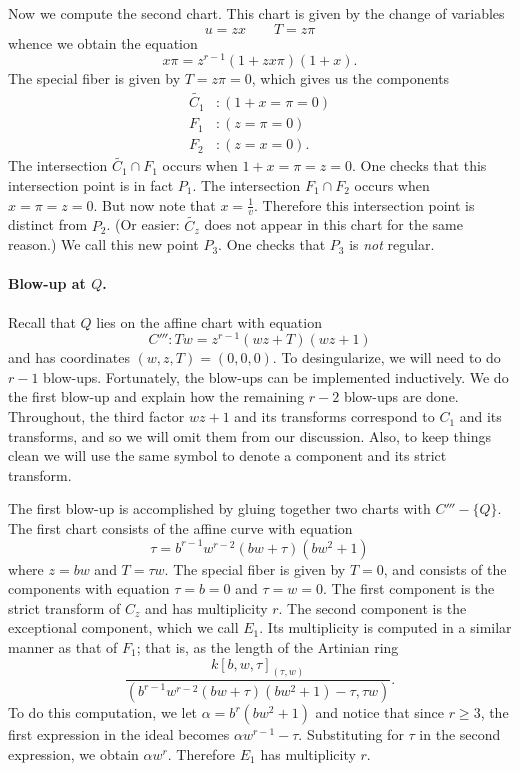 \documentclass{article}
\theoremstyle{plain}
\theoremstyle{definition}
\theoremstyle{remark}
\renewcommand{\tilde}[1]{\widetilde{#1}}
\begin{document}
Now we compute the second chart. This chart is given by the change of variables
\[
u=zx \qquad T=z\pi
\]
whence we obtain the equation
\[
x\pi = z^{r-1}(1 + zx\pi)(1 + x).
\]
The special fiber is given by $T = z\pi = 0$, which gives us the components
\begin{align*}
  \tilde{C_1}&: (1 + x = \pi = 0) \\
  F_1&: (z = \pi = 0) \\
  F_2&: (z = x = 0).
\end{align*}
The intersection $\tilde{C_1} \cap F_1$ occurs when $1 + x = \pi = z = 0$. One checks that this intersection point is in fact $P_1$. The intersection $F_1 \cap F_2$ occurs when $x = \pi = z = 0$. But now note that $x = \frac{1}{v}$. Therefore this intersection point is distinct from $P_2$. (Or easier: $\tilde{C_z}$ does not appear in this chart for the same reason.) We call this new point $P_3$. One checks that $P_3$ is \emph{not} regular.



\paragraph{Blow-up at $Q$.}
\label{sec:blow-up-Q}

Recall that $Q$ lies on the affine chart with equation
\begin{equation}
  C''':Tw = z^{r-1}(wz + T)(wz + 1)\label{eq:C'''}
\end{equation}
and has coordinates $(w,z,T) = (0,0,0)$. To desingularize, we will need to do $r-1$ blow-ups. Fortunately, the blow-ups can be implemented inductively. We do the first blow-up and explain how the remaining $r-2$ blow-ups are done. Throughout, the third factor $wz + 1$ and its transforms correspond to $C_1$ and its transforms, and so we will omit them from our discussion. Also, to keep things clean we will use the same symbol to denote a component and its strict transform.

The first blow-up is accomplished by gluing together two charts with $C'''-\{Q\}$. The first chart consists of the affine curve with equation
\[
\tau = b^{r-1} w^{r-2} (bw + \tau) (b w^2 + 1)
\]
where $z = bw$ and $T = \tau w$. The special fiber is given by $T = 0$, and consists of the components with equation $\tau = b = 0$ and $\tau = w = 0$. The first component is the strict transform of ${C_z}$ and has multiplicity $r$. The second component is the exceptional component, which we call $E_1$. Its multiplicity is computed in a similar manner as that of $F_1$; that is, as the length of the Artinian ring
\[
\frac{k[b,w,\tau]_{(\tau, w)}}{(b^{r-1}w^{r-2}(bw + \tau)(bw^2 + 1) - \tau, \tau w)}.
\]
To do this computation, we let $\alpha = b^r(bw^2 + 1)$ and notice that since $r \geq 3$, the first expression in the ideal becomes $\alpha w^{r-1} - \tau$. Substituting for $\tau$ in the second expression, we obtain $\alpha w^r$. Therefore $E_1$ has multiplicity $r$.
\end{document}
